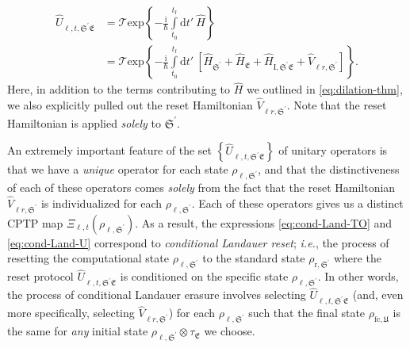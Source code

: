 \documentclass[preprints,article,accept,moreauthors,pdftex]{Definitions/mdpi}
\begin{document}
\begin{paracol}{2}
\begin{equation}
    \label{eq:cond-Land-U}
    \begin{split}
        \widehat{U}_{\ell,t,\mathfrak{S^\prime E}} &= \mathcal{T} \mathrm{exp} \left\{-\frac{\mathrm{i}}{\hbar}\int \limits_{t_{0}}^{t_\mathrm{f}} \mathrm{d}t'\:\widehat{H} \right\} \\[4pt]
        &= \mathcal{T} \mathrm{exp} \left\{-\frac{\mathrm{i}}{\hbar}\int \limits_{t_{0}}^{t_\mathrm{f}} \mathrm{d}t'\: \left[\widehat{H}_{\mathfrak{S}^{\prime}} + \widehat{H}_{\mathfrak{E}} + \widehat{H}_{\mathrm{I}, \mathfrak{S^\prime E}} + \widehat{V}_{\ell r,\mathfrak{S}^{\prime}}\right] \right\}.
    \end{split}
\end{equation}
Here, in addition to the terms contributing to $\widehat{H}$ we outlined in \eqref{eq:dilation-thm}, we also explicitly pulled out the reset Hamiltonian $\widehat{V}_{\ell r,\mathfrak{S}^{\prime}}$. Note that the reset Hamiltonian is applied \emph{solely} to $\mathfrak{S}^{\prime}$.

An extremely important feature of the set 
$\left\{\widehat{U}_{\ell,t,\mathfrak{S^\prime E}}\right\}$ of unitary operators is that we have a \emph{unique} operator for each state $\rho_{\ell,\mathfrak{S}^{\prime}}$, and that the distinctiveness of each of these operators comes \emph{solely} from the fact that the reset Hamiltonian $\widehat{V}_{\ell r,\mathfrak{S}^{\prime}}$ is individualized for each $\rho_{\ell,\mathfrak{S}^{\prime}}$. Each of these operators gives us a distinct CPTP map $\Xi_{\ell,t}\left(\rho_{\ell,\mathfrak{S}^{\prime}}\right)$. As a result, the expressions \eqref{eq:cond-Land-TO} and \eqref{eq:cond-Land-U} correspond to \emph{conditional Landauer reset}; \emph{i.e.}, the process of resetting the computational state $\rho_{\ell,\mathfrak{S}^{\prime}}$ to the standard state $\rho_{\mathrm{r},\mathfrak{S}^{\prime}}$ where the reset protocol $\widehat{U}_{\ell,t,\mathfrak{S^\prime E}}$ is conditioned on the specific state $\rho_{\ell,\mathfrak{S}^{\prime}}$. In other words, the process of conditional Landauer erasure involves selecting $\widehat{U}_{\ell,t,\mathfrak{S^\prime E}}$ (and, even more specifically, selecting $\widehat{V}_{\ell r,\mathfrak{S}^{\prime}}$) for each $\rho_{\ell,\mathfrak{S}^{\prime}}$ such that the final state $\rho_{\mathrm{f}\mathrm{c},\mathfrak{U}}$ is the same for \emph{any} initial state $\rho_{\ell,\mathfrak{S}^{\prime}} \otimes \tau_{\mathfrak{E}}$ we choose.


\end{paracol}
\end{document}
